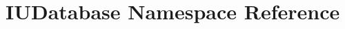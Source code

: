 \hypertarget{namespaceIUDatabase}{\section{I\-U\-Database Namespace Reference}
\label{namespaceIUDatabase}
}
